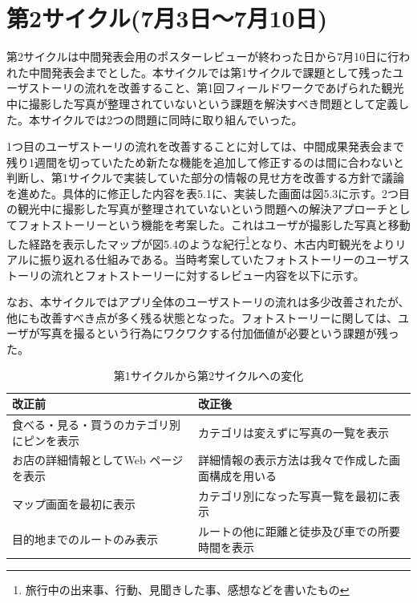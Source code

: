 \section{第2サイクル(7月3日〜7月10日)}
第2サイクルは中間発表会用のポスターレビューが終わった日から7月10日に行われた中間発表会までとした。本サイクルでは第1サイクルで課題として残ったユーザストーリの流れを改善すること、第1回フィールドワークであげられた観光中に撮影した写真が整理されていないという課題を解決すべき問題として定義した。本サイクルでは2つの問題に同時に取り組んでいった。
\par 1つ目のユーザストーリの流れを改善することに対しては、中間成果発表会まで残り1週間を切っていたため新たな機能を追加して修正するのは間に合わないと判断し、第1サイクルで実装していた部分の情報の見せ方を改善する方針で議論を進めた。具体的に修正した内容を表5.1に、実装した画面は図5.3に示す。2つ目の観光中に撮影した写真が整理されていないという問題への解決アプローチとしてフォトストーリーという機能を考案した。これはユーザが撮影した写真と移動した経路を表示したマップが図5.4のような紀行\footnote{旅行中の出来事、行動、見聞きした事、感想などを書いたもの}となり、木古内町観光をよりリアルに振り返れる仕組みである。当時考案していたフォトストーリーのユーザストーリの流れとフォトストーリーに対するレビュー内容を以下に示す。
\par なお、本サイクルではアプリ全体のユーザストーリの流れは多少改善されたが、他にも改善すべき点が多く残る状態となった。フォトストーリーに関しては、ユーザが写真を撮るという行為にワクワクする付加価値が必要という課題が残った。

\begin{table}[htb]
\centering
\caption{第1サイクルから第2サイクルへの変化}
  \begin{tabular}{|l|l|} \hline
    改正前&改正後  \\ \hline 
    食べる・見る・買うのカテゴリ別にピンを表示 & \parbox{20zw}{カテゴリは変えずに写真の一覧を表示} \\  \hline
    お店の詳細情報としてWeb ページを表示 &\parbox{20zw}{詳細情報の表示方法は我々で作成した画面構成を用いる}\\ \hline
    マップ画面を最初に表示 & \parbox{20zw}{カテゴリ別になった写真一覧を最初に表示}\\ \hline
    目的地までのルートのみ表示 & \parbox{20zw}{ルートの他に距離と徒歩及び車での所要時間を表示} \\ \hline
  \end{tabular} 
\end{table}

